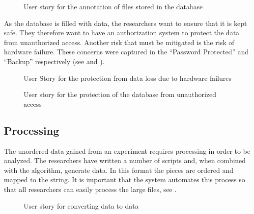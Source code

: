 \begin{figure}[h!]
\caption{User story for the annotation of files stored in the database}
\label{fig:target_annotation}
\end{figure}

As the database is filled with data, the researchers want to ensure that it is kept safe. They therefore want to have an authorization system to protect the data from unauthorized access. Another risk that must be mitigated is the risk of hardware failure. These concerns were captured in the  ``Password Protected'' and ``Backup'' respectively (see  and ).

\begin{figure}[h!]
\caption{User Story for the protection from data loss due to hardware failures}
\label{fig:target_backup}
\end{figure}

\begin{figure}[h!]
\caption{User story for the protection of the database from unauthorized access}
\label{fig:target_password}
\end{figure}
\FloatBarrier

\subsection{Processing}
The unordered  data gained from an experiment requires processing in order to be analyzed. The researchers have written a number of scripts and, when combined with the  algorithm, generate  data. In this format the  pieces are ordered and mapped to the  string. It is important that the system automates this process so that all researchers can easily process the large  files, see . 

\begin{figure}[h]
\caption{User story for converting  data to  data}
\label{fig:target_r2p}
\end{figure}

